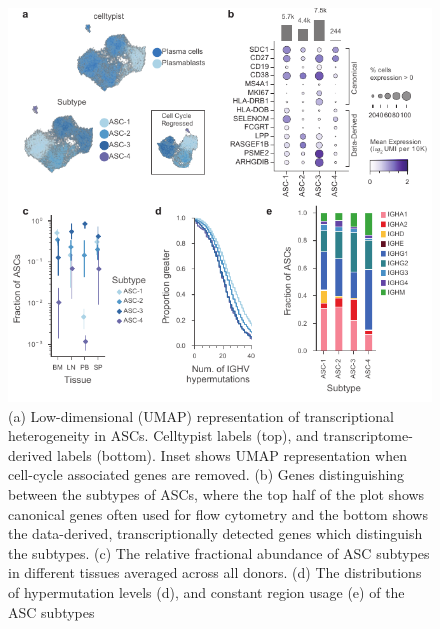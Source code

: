 \begin{figure}
    \centering
    \includegraphics[width=12cm]{figs/Tabula_Bursa/Figure2_ASC_subtypes.pdf}

    \caption[Heterogeneity in antibody secreting cells (ASCs)]{ (a) Low-dimensional (UMAP) representation of transcriptional heterogeneity in ASCs. Celltypist labels (top), and transcriptome-derived labels (bottom). Inset shows UMAP representation when cell-cycle associated genes are removed. (b) Genes distinguishing between the subtypes of ASCs, where the top half of the plot shows canonical genes often used for flow cytometry and the bottom shows the data-derived, transcriptionally detected genes which distinguish the subtypes. (c) The relative fractional abundance of ASC subtypes in different tissues averaged across all donors. (d) The distributions of  hypermutation levels (d),  and constant region usage (e) of the ASC subtypes}
    \label{fig:asc-overview}
\end{figure}
